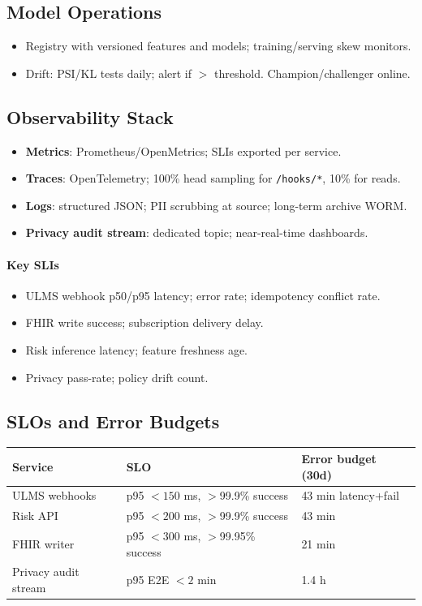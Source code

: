 \documentclass[11pt]{article}
\theoremstyle{plain}
\begin{document}
\subsection{Model Operations}
\begin{itemize}
  \item Registry with versioned features and models; training/serving skew monitors.
  \item Drift: PSI/KL tests daily; alert if $>$ threshold. Champion/challenger online.
\end{itemize}

\subsection{Observability Stack}
\begin{itemize}
  \item \textbf{Metrics}: Prometheus/OpenMetrics; SLIs exported per service.
  \item \textbf{Traces}: OpenTelemetry; 100\% head sampling for \texttt{/hooks/*}, 10\% for reads.
  \item \textbf{Logs}: structured JSON; PII scrubbing at source; long-term archive WORM.
  \item \textbf{Privacy audit stream}: dedicated topic; near-real-time dashboards.
\end{itemize}

\paragraph{Key SLIs}
\begin{itemize}
  \item ULMS webhook p50/p95 latency; error rate; idempotency conflict rate.
  \item FHIR write success; subscription delivery delay.
  \item Risk inference latency; feature freshness age.
  \item Privacy pass-rate; policy drift count.
\end{itemize}

\subsection{SLOs and Error Budgets}
\begin{center}
\begin{tabular}{l l l}
\hline
Service & SLO & Error budget (30d) \\
\hline
ULMS webhooks & p95 $<150$ ms, $>$99.9\% success & 43 min latency+fail \\
Risk API & p95 $<200$ ms, $>$99.9\% success & 43 min \\
FHIR writer & p95 $<300$ ms, $>$99.95\% success & 21 min \\
Privacy audit stream & p95 E2E $<2$ min & 1.4 h \\
\hline
\end{tabular}
\end{center}
\end{document}
